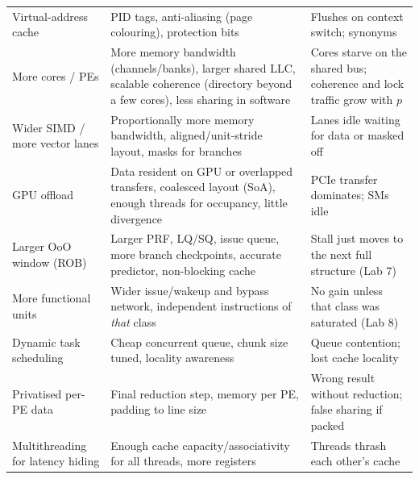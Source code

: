 \begin{longtable}{L{4.6cm}L{5.4cm}L{5.4cm}}
Virtual-address cache & PID tags, anti-aliasing (page colouring), protection bits & Flushes on context switch; synonyms \\
More cores / PEs & More memory bandwidth (channels/banks), larger shared LLC, scalable coherence (directory beyond a few cores), less sharing in software & Cores starve on the shared bus; coherence and lock traffic grow with $p$ \\
Wider SIMD / more vector lanes & Proportionally more memory bandwidth, aligned/unit-stride layout, masks for branches & Lanes idle waiting for data or masked off \\
GPU offload & Data resident on GPU or overlapped transfers, coalesced layout (SoA), enough threads for occupancy, little divergence & PCIe transfer dominates; SMs idle \\
Larger OoO window (ROB) & Larger PRF, LQ/SQ, issue queue, more branch checkpoints, accurate predictor, non-blocking cache & Stall just moves to the next full structure (Lab 7) \\
More functional units & Wider issue/wakeup and bypass network, independent instructions of \emph{that} class & No gain unless that class was saturated (Lab 8) \\
Dynamic task scheduling & Cheap concurrent queue, chunk size tuned, locality awareness & Queue contention; lost cache locality \\
Privatised per-PE data & Final reduction step, memory per PE, padding to line size & Wrong result without reduction; false sharing if packed \\
Multithreading for latency hiding & Enough cache capacity/associativity for all threads, more registers & Threads thrash each other's cache \\
\bottomrule
\end{longtable}
\normalsize

